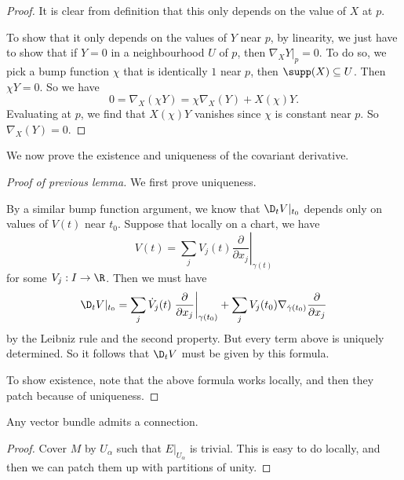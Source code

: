 \documentclass[a4paper]{article}
\begin{document}
\begin{proof}
  It is clear from definition that this only depends on the value of $X$ at $p$.

  To show that it only depends on the values of $Y$ near $p$, by linearity, we just have to show that if $Y = 0$ in a neighbourhood $U$ of $p$, then $\nabla_X Y|_p = 0$. To do so, we pick a bump function $\chi$ that is identically $1$ near $p$, then $\supp(X) \subseteq U$. Then $\chi Y = 0$. So we have
  \[
    0 = \nabla_X (\chi Y) = \chi \nabla_X(Y) + X(\chi) Y.
  \]
  Evaluating at $p$, we find that $X(\chi) Y$ vanishes since $\chi$ is constant near $p$. So $\nabla_X(Y) = 0$.
\end{proof}

We now prove the existence and uniqueness of the covariant derivative.
\begin{proof}[Proof of previous lemma]
  We first prove uniqueness.

  By a similar bump function argument, we know that $\D_t V|_{t_0}$ depends only on values of $V(t)$ near $t_0$. Suppose that locally on a chart, we have
  \[
    V(t) = \sum_j V_j(t) \left.\frac{\partial}{\partial x_j}\right|_{\gamma(t)}
  \]
  for some $V_j: I \to \R$. Then we must have
  \[
    \D_t V|_{t_0} = \sum_j \dot{V}_j (t) \left.\frac{\partial}{\partial x_j}\right|_{\gamma(t_0)} + \sum_j V_j(t_0) \nabla_{\dot{\gamma}(t_0)} \frac{\partial}{\partial x_j}
  \]
  by the Leibniz rule and the second property. But every term above is uniquely determined. So it follows that $\D_t V$ must be given by this formula.

  To show existence, note that the above formula works locally, and then they patch because of uniqueness.
\end{proof}

\begin{prop}
  Any vector bundle admits a connection.
\end{prop}

\begin{proof}
  Cover $M$ by $U_\alpha$ such that $E|_{U_\alpha}$ is trivial. This is easy to do locally, and then we can patch them up with partitions of unity.
\end{proof}
\end{document}
